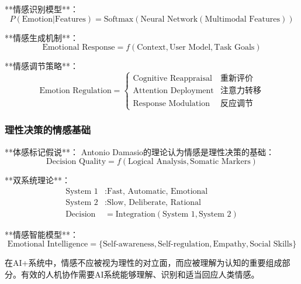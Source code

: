 **情感识别模型**：
\begin{equation}
P(\text{Emotion}|\text{Features}) = \text{Softmax}(\text{Neural Network}(\text{Multimodal Features}))
\end{equation}

**情感生成机制**：
\begin{equation}
\text{Emotional Response} = f(\text{Context}, \text{User Model}, \text{Task Goals})
\end{equation}

**情感调节策略**：
\begin{equation}
\text{Emotion Regulation} = \begin{cases}
\text{Cognitive Reappraisal} & \text{重新评价} \\
\text{Attention Deployment} & \text{注意力转移} \\
\text{Response Modulation} & \text{反应调节}
\end{cases}
\end{equation}

\subsubsection{理性决策的情感基础} %

**体感标记假说**：
Antonio Damasio的理论认为情感是理性决策的基础：
\begin{equation}
\text{Decision Quality} = f(\text{Logical Analysis}, \text{Somatic Markers})
\end{equation}

**双系统理论**：
\begin{align}
\text{System 1} &: \text{Fast, Automatic, Emotional} \\
\text{System 2} &: \text{Slow, Deliberate, Rational} \\
\text{Decision} &= \text{Integration}(\text{System 1}, \text{System 2})
\end{align}

**情感智能模型**：
\begin{equation}
\text{Emotional Intelligence} = \{\text{Self-awareness}, \text{Self-regulation}, \text{Empathy}, \text{Social Skills}\}
\end{equation}

\begin{center}
在AI+系统中，情感不应被视为理性的对立面，而应被理解为认知的重要组成部分。有效的人机协作需要AI系统能够理解、识别和适当回应人类情感。
\end{center}

